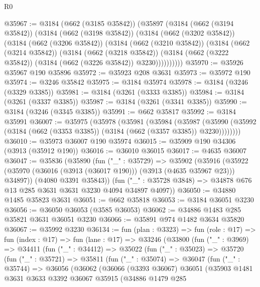 \begin{lexlean}{R0}
\begin{coremodule}
@35967 := @3184
    (@662 (@3185 @35842))
    (@35897
      (@3184
        (@662 (@3194 @35842))
        (@3184
          (@662 (@3198 @35842))
          (@3184
            (@662 (@3202 @35842))
            (@3184
              (@662 (@3206 @35842))
              (@3184
                (@662 (@3210 @35842))
                (@3184
                  (@662 (@3214 @35842))
                  (@3184
                    (@662 (@3218 @35842))
                    (@3184 (@662 (@3222 @35842)) (@3184 (@662 (@3226 @35842)) @3230))))))))))
@35970 := @35926 @35967 @190 @35896
@35972 := @35923 @208 @3631
@35973 := @35972 @190
@35974 := @3246 @35842
@35975 := @3184 @35974
@35978 := @3184 (@3246 (@3329 @3385))
@35981 := @3184 (@3261 (@3333 @3385))
@35984 := @3184 (@3261 (@3337 @3385))
@35987 := @3184 (@3261 (@3341 @3385))
@35990 := @3184 (@3246 (@3345 @3385))
@35991 := @662 @35817
@35992 := @3184 @35991
@36007 := @35975
    (@35978
      (@35981
        (@35984
          (@35987
            (@35990 (@35992 (@3184 (@662 (@3353 @3385)) (@3184 (@662 (@3357 @3385)) @3230))))))))
@36010 := @35973 @36007 @190 @35974
@36015 := @35909 @190 @34306 (@3913 (@35912 @190))
@36016 := @36010 @36015
@36017 := @4635 @36007
@36047 := @35836
    (@35890
      (fun ("_" : @35729) =>
      @35902
        (@35916 (@35922 (@35970 (@36016 (@3913 (@36017 @190))) (@3913 (@4635 @35967 @23))) @34897))
        (@4080 @3391 @35843))
      (fun ("_" : @35728 @3848) => @34878 @676 @13 @285 @3631 @3631 @3230 @4094 @34897 @4097))
@36050 := @34880 @1485 @35823 @3631
@36051 := @662 @35818
@36053 := @3184 @36051 @3230
@36056 := @36050 @36053 (@3585 @36053)
@36062 := @34886 @1483 @285 @35821 @3631 @36051 @3230
@36066 := @35891 @974 @1482 @3634 @35820
@36067 := @35992 @3230
@36134 := fun (plan : @3323) =>
  fun (role : @17) =>
  fun (index : @17) =>
  fun (lane : @17) =>
  @33246
    (@33800
      (fun ("_" : @3969) =>
      @34411
        (fun ("_" : @34412) =>
        @35022
          (fun ("_" : @35023) =>
          @35720
            (fun ("_" : @35721) =>
            @35811
              (fun ("_" : @35074) =>
              @36047
                (fun ("_" : @35744) =>
                @36056
                  (@36062
                    (@36066
                      (@3393 @36067)
                      @36051
                      (@35903
                        @1481
                        @3631
                        @3633
                        @3392
                        @36067
                        @35915
                        (@34886
                          @1479
                          @285

\end{coremodule}
\end{lexlean}
